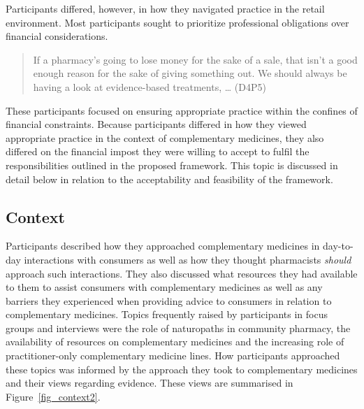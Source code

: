 \documentclass[11pt,a4paper]{article}
\begin{document}
Participants differed, however, in how they navigated practice in the
retail environment. Most participants sought to prioritize professional
obligations over financial considerations.

\begin{quote}
If a pharmacy's going to lose money for the sake of a sale, that isn't a
good enough reason for the sake of giving something out. We should
always be having a look at evidence-based treatments, \ldots{} (D4P5)
\end{quote}

These participants focused on ensuring appropriate practice within the
confines of financial constraints. Because participants differed in how
they viewed appropriate practice in the context of complementary
medicines, they also differed on the financial impost they were willing
to accept to fulfil the responsibilities outlined in the proposed
framework. This topic is discussed in detail below in relation to the
acceptability and feasibility of the framework.

\subsection{Context}\label{context}

Participants described how they approached complementary medicines in
day-to-day interactions with consumers as well as how they thought
pharmacists \emph{should} approach such interactions. They also
discussed what resources they had available to them to assist consumers
with complementary medicines as well as any barriers they experienced
when providing advice to consumers in relation to complementary
medicines. Topics frequently raised by participants in focus groups and
interviews were the role of naturopaths in community pharmacy, the
availability of resources on complementary medicines and the increasing
role of practitioner-only complementary medicine lines. How participants
approached these topics was informed by the approach they took to
complementary medicines and their views regarding evidence. These views
are summarised in Figure~\ref{fig_context2}.
\end{document}
